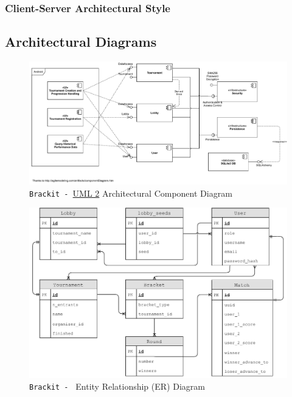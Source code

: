 \documentclass{article}
\begin{document}
\subsubsection{Client-Server Architectural Style}
\lipsum[2-4]
\clearpage
\subsection{Architectural Diagrams}
\vfill
\begin{center}
    \begin{figure}[htp]
        \centering
        \includegraphics[width=14.5cm]{../diagrams/component_diag.pdf}
        \caption{\texttt{Brackit - }\href{https://sparxsystems.com/resources/tutorials/uml2/index.html}{UML 2} Architectural Component Diagram}
        \end{figure}
\end{center}
\vfill

\begin{center}
    \begin{figure}[h]
        \centering
        \includegraphics[width=12.5cm]{../diagrams/er_compressed.pdf}
        \caption{\texttt{Brackit - } Entity Relationship (ER) Diagram}
        \end{figure}
\end{center}
\clearpage
\end{document}
